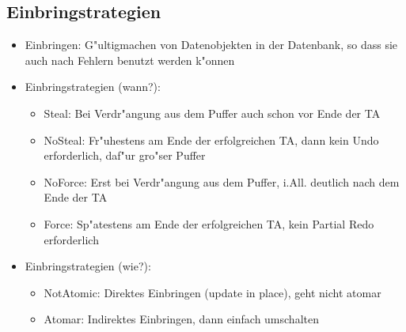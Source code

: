 \documentclass[a4paper, 12pt]{scrartcl}
\begin{document}
\subsection{Einbringstrategien}
\begin{itemize}
	\item
		Einbringen: G"ultigmachen von Datenobjekten in der Datenbank, so dass sie auch nach Fehlern benutzt werden k"onnen
	\item Einbringstrategien (wann?):
		\begin{itemize}
			\item
				Steal: Bei Verdr"angung aus dem Puffer auch schon vor Ende der TA
			\item
				NoSteal: Fr"uhestens am Ende der erfolgreichen TA, dann kein Undo erforderlich, daf"ur gro"ser Puffer
			\item
				NoForce: Erst bei Verdr"angung aus dem Puffer, i.All. deutlich nach dem Ende der TA
			\item
				Force: Sp"atestens am Ende der erfolgreichen TA, kein Partial Redo erforderlich
		\end{itemize}
	\item
		Einbringstrategien (wie?):
		\begin{itemize}
			\item
				NotAtomic: Direktes Einbringen (update in place), geht nicht atomar
			\item
				Atomar: Indirektes Einbringen, dann einfach umschalten
		\end{itemize}
\end{itemize}
\end{document}
